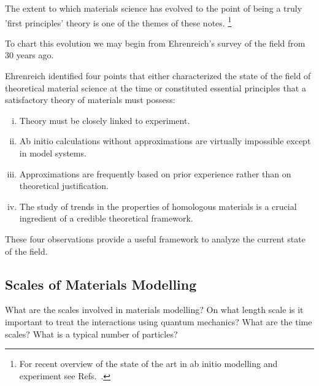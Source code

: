 The extent to which materials science has evolved to the point of being 
a truly 'first principles' theory is one of the themes of these notes. 
\footnote{For recent overview of the state of the art in ab initio modelling 
and experiment see Refs.~\cite{finnis12, ismailbeigi2017}.}
%
%

To chart this evolution we may begin from Ehrenreich's survey of the field from 30 years ago.

Ehrenreich identified four points that either characterized the state 
of the field of theoretical material science at the time or constituted essential principles 
that a satisfactory theory of materials must possess:
%
\begin{enumerate}[i)]
\label{en:ehrenreich}
\item Theory must be closely linked to experiment.
\item Ab initio calculations without approximations are virtually impossible 
      except in model systems.
\item Approximations are frequently based on prior experience rather 
      than on theoretical justification.
\item The study of trends in the properties of homologous materials 
      is a crucial ingredient of a credible theoretical framework.
\end{enumerate}
%
These four observations provide a useful framework to analyze the current state of the field.

\subsection{Scales of Materials Modelling}
What are the scales involved in materials modelling?
On what length scale is it important to treat the interactions
using quantum mechanics? What are the time scales? 
What is a typical number of particles?

